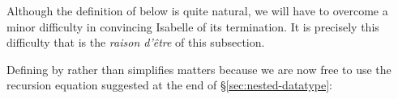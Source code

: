 %
\begin{isabellebody}%
\def\isabellecontext{Nested{\isadigit{1}}}%
%
\begin{isamarkuptext}%
\noindent
Although the definition of  below is quite natural, we will have
to overcome a minor difficulty in convincing Isabelle of its termination.
It is precisely this difficulty that is the \textit{raison d'\^etre} of
this subsection.

Defining  by  rather than 
simplifies matters because we are now free to use the recursion equation
suggested at the end of \S\ref{sec:nested-datatype}:%
\end{isamarkuptext}%
\ \end{isabellebody}%
